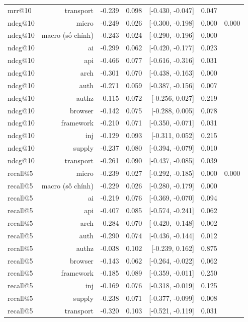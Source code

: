 \begin{table}[ht]
\begin{tabular}{lrrrrrr}
mrr@10 & transport & -0.239 & 0.098 & [-0.430, -0.047] & 0.047 &  \\
ndcg@10 & micro & -0.249 & 0.026 & [-0.300, -0.198] & 0.000 & 0.000 \\
ndcg@10 & macro (số chính) & -0.243 & 0.024 & [-0.290, -0.196] & 0.000 &  \\
ndcg@10 & ai & -0.299 & 0.062 & [-0.420, -0.177] & 0.023 &  \\
ndcg@10 & api & -0.466 & 0.077 & [-0.616, -0.316] & 0.031 &  \\
ndcg@10 & arch & -0.301 & 0.070 & [-0.438, -0.163] & 0.000 &  \\
ndcg@10 & auth & -0.271 & 0.059 & [-0.387, -0.156] & 0.007 &  \\
ndcg@10 & authz & -0.115 & 0.072 & [-0.256, 0.027] & 0.219 &  \\
ndcg@10 & browser & -0.142 & 0.075 & [-0.288, 0.005] & 0.078 &  \\
ndcg@10 & framework & -0.210 & 0.071 & [-0.350, -0.071] & 0.031 &  \\
ndcg@10 & inj & -0.129 & 0.093 & [-0.311, 0.052] & 0.215 &  \\
ndcg@10 & supply & -0.237 & 0.080 & [-0.394, -0.079] & 0.010 &  \\
ndcg@10 & transport & -0.261 & 0.090 & [-0.437, -0.085] & 0.039 &  \\
recall@5 & micro & -0.239 & 0.027 & [-0.292, -0.185] & 0.000 & 0.000 \\
recall@5 & macro (số chính) & -0.229 & 0.026 & [-0.280, -0.179] & 0.000 &  \\
recall@5 & ai & -0.219 & 0.076 & [-0.369, -0.070] & 0.094 &  \\
recall@5 & api & -0.407 & 0.085 & [-0.574, -0.241] & 0.062 &  \\
recall@5 & arch & -0.284 & 0.070 & [-0.420, -0.148] & 0.002 &  \\
recall@5 & auth & -0.290 & 0.074 & [-0.436, -0.144] & 0.012 &  \\
recall@5 & authz & -0.038 & 0.102 & [-0.239, 0.162] & 0.875 &  \\
recall@5 & browser & -0.143 & 0.062 & [-0.264, -0.022] & 0.062 &  \\
recall@5 & framework & -0.185 & 0.089 & [-0.359, -0.011] & 0.250 &  \\
recall@5 & inj & -0.169 & 0.076 & [-0.318, -0.019] & 0.125 &  \\
recall@5 & supply & -0.238 & 0.071 & [-0.377, -0.099] & 0.008 &  \\
recall@5 & transport & -0.320 & 0.103 & [-0.521, -0.119] & 0.031 &  \\

\end{tabular}
\end{table}
